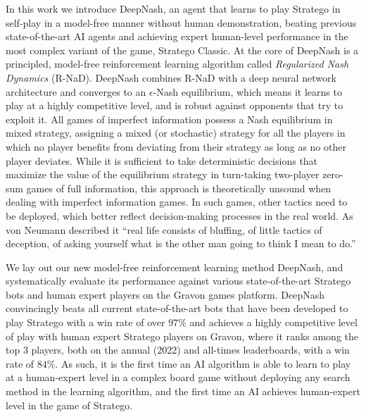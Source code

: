 In this work we introduce DeepNash, an agent that learns to play Stratego in self-play in a model-free manner without human demonstration, beating previous state-of-the-art AI agents and achieving expert human-level performance in the most complex variant of the game, Stratego Classic. At the core of DeepNash is a principled, model-free reinforcement learning algorithm called \emph{Regularized Nash Dynamics} (R-NaD). DeepNash combines R-NaD with a deep neural network architecture and converges to an $\epsilon$-Nash equilibrium, which means it learns to play at a highly competitive level, and is robust against opponents that try to exploit it. All games of imperfect information possess a Nash equilibrium in mixed strategy, assigning a mixed (or stochastic) strategy for all the players in which no player benefits from deviating from their strategy as long as no other player deviates. While it is sufficient to take deterministic decisions that maximize the value of the equilibrium strategy in turn-taking two-player zero-sum games of full information, this approach is theoretically unsound when dealing with imperfect information games. In such games, other tactics need to be deployed, which better reflect decision-making processes in the real world. As von Neumann described it ``real life consists of bluffing, of little tactics of deception, of asking yourself what is the other man going to think I mean to do.''

We lay out our new model-free reinforcement learning method DeepNash, and systematically evaluate its performance against various state-of-the-art Stratego bots and human expert players on the Gravon games platform. DeepNash convincingly beats all current state-of-the-art bots that have been developed to play Stratego with a win rate of over $97\%$ and achieves a highly competitive level of play with human expert Stratego players on Gravon, where it ranks among the top $3$ players, both on the annual (2022) and all-times leaderboards, with a win rate of $84\%$. As such, it is the first time an AI algorithm is able to learn to play at a human-expert level in a complex board game without deploying any search method in the learning algorithm, and the first time an AI achieves human-expert level in the game of Stratego.

